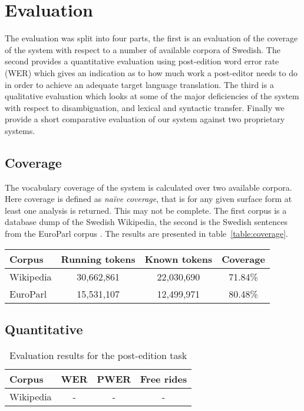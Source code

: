\documentclass[11pt]{article}
\begin{document}
\section{Evaluation}

The evaluation was split into four parts, the first is an evaluation of the coverage
of the system with respect to a number of available corpora of Swedish. The second
provides a quantitative evaluation using post-edition word error rate (WER) which 
gives an indication as to how much work a post-editor needs to do in order to 
achieve an adequate target language translation. The third is a qualitative evaluation
which looks at some of the major deficiencies of the system with respect to disambiguation,
and lexical and syntactic transfer. Finally we provide a short comparative evaluation of
our system against two proprietary systems.

\subsection{Coverage}

The vocabulary coverage of the system is calculated over two available corpora. Here coverage
is defined as \emph{na\"ive coverage}, that is for any given surface form at least one analysis
is returned. This may not be complete. The first corpus is a database dump of the Swedish 
Wikipedia, the second is the Swedish sentences from the EuroParl corpus \cite{Koehn2005}. The 
results are presented in table~\ref{table:coverage}.

\begin{table*}
\centering
\begin{tabular}{|l|c|c|c|}
\hline
Corpus & Running tokens & Known tokens & Coverage \\
\hline
Wikipedia  & 30,662,861 & 22,030,690 & 71.84\%\\
EuroParl   & 15,531,107 & 12,499,971 & 80.48\%\\
\hline
\end{tabular}
    \caption{Naïve coverage for two corpora}
    \label{table:coverage}
\end{table*}

\subsection{Quantitative}

\begin{table}
\centering
\begin{tabular}{|l|c|c|c|}
\hline
Corpus    & WER & PWER & Free rides\\
\hline
Wikipedia & -   & -    & -\\
\hline
\end{tabular}
    \caption{Evaluation results for the post-edition task}
    \label{table:quanteval}
\end{table}
\end{document}
